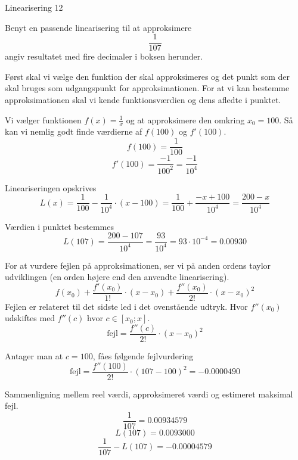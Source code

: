 \documentclass{article}
\begin{document}
\begin{exercise}{Linearisering 12}

Benyt en passende linearisering til at approksimere
\[
\frac{1}{107}
\]
angiv resultatet med fire decimaler i boksen herunder.

\hint
Først skal vi vælge den funktion der skal approksimeres
og det punkt som der skal bruges som udgangspunkt for
approksimationen.
For at vi kan bestemme approksimationen skal vi
kende funktionsværdien og dens afledte i punktet.

\hint
Vi vælger funktionen $f(x) = \frac{1}{x}$ og at approksimere den
omkring $x_0 = 100$.
Så kan vi nemlig godt finde værdierne af $f(100)$ og $f'(100)$.
\[
f(100) = \frac{1}{100}
\]
\[
f'(100) = \frac{-1}{100^2} = \frac{-1}{10^4}
\]

\hint
Lineariseringen opskrives
\[
L(x) = \frac{1}{100} - \frac{1}{10^4} \cdot (x - 100) = \frac{1}{100} + \frac{-x + 100}{10^4} = \frac{200 - x}{10^4}
\]

\hint
Værdien i punktet bestemmes
\[
L(107) = \frac{200 - 107}{10^4} = \frac{93}{10^4} = 93 \cdot 10^{-4} = 0.00930
\]


\hint
For at vurdere fejlen på approksimationen, ser vi på anden
ordens taylor udviklingen (en orden højere end den
anvendte linearisering).
\[
f(x_0)
+ \frac{f'(x_0)}{1!} \cdot (x - x_0)
+ \frac{f''(x_0)}{2!} \cdot (x - x_0)^2
\]
Fejlen er relateret til det sidste led i det ovenstående udtryk.
Hvor $f''(x_0)$ udskiftes med $f''(c)$ hvor $c \in [x_0; x]$.
\[
\textrm{fejl} = \frac{f''(c)}{2!} \cdot (x - x_0)^2
\]

\hint
Antager man at $c = 100$, fåes følgende fejlvurdering
\[
\textrm{fejl} = \frac{f''(100)}{2!} \cdot (107 - 100)^2 =
-0.0000490\]

\hint
Sammenligning mellem reel værdi, approksimeret værdi og estimeret maksimal fejl.
\[
\frac{1}{107} = 0.00934579
\]
\[
L(107) = 0.0093000
\]
\[
\frac{1}{107} - L(107) = -0.00004579
\]

\end{exercise}
\end{document}
